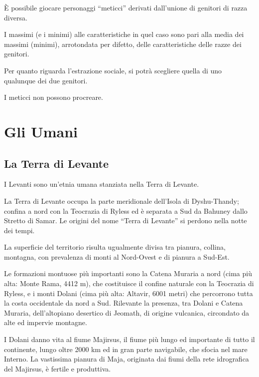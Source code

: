 \`E possibile giocare personaggi ``meticci'' derivati dall'unione di
genitori di razza diversa.

I massimi (e i minimi) alle caratteristiche in quel caso sono pari
alla media dei massimi (minimi), arrotondata per difetto, delle
caratteristiche delle razze dei genitori.

Per quanto riguarda l'estrazione sociale, si potr\`a scegliere quella
di uno qualunque dei due genitori.

I meticci non possono procreare.


\fi

\clearpage
\section{Gli Umani}

\subsection{La Terra di Levante}


I Levanti sono un'etnia umana stanziata nella Terra di Levante. 

\Geografia La Terra di Levante occupa la parte meridionale dell'Isola
di Dyshu-Thandy; confina a nord con la Teocrazia di Ryless ed \`e
separata a Sud da Bahuney dallo Stretto di Samar. Le origini del nome
``Terra di Levante'' si perdono nella notte dei tempi.

La superficie del territorio risulta ugualmente divisa tra pianura, collina,
montagna, con prevalenza di monti al Nord-Ovest e di pianura a Sud-Est. 

Le formazioni montuose pi\`u importanti sono la Catena Muraria a nord
(cima pi\`u alta: Monte Rama, 4412 m), che costituisce il confine
naturale con la Teocrazia di Ryless, e i monti Dolani (cima pi\`u
alta: Altavir, 6001 metri) che percorrono tutta la costa occidentale
da nord a Sud. Rilevante la presenza, tra Dolani e Catena Muraria,
dell'altopiano desertico di Jeomath, di origine vulcanica, circondato
da alte ed impervie montagne.

I Dolani danno vita al fiume Majirsus, il fiume pi\`u lungo ed
importante di tutto il continente, lungo oltre 2000 km ed in gran
parte navigabile, che sfocia nel mare Interno. La vastissima pianura
di Maja, originata dai fiumi della rete idrografica del Majirsus, \`e
fertile e produttiva.

